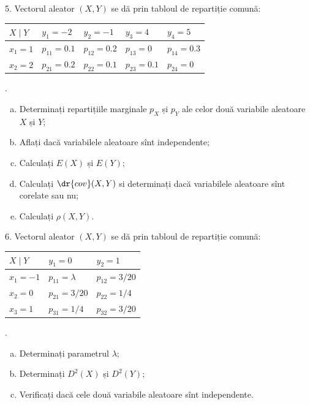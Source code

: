 5. Vectorul aleator $ (X, Y) $ se dă prin tabloul de repartiție comună:
\begin{center}
  \begin{tabular}{l|l|l|l|l}
    $ X \mid Y $ & $ y_1 = -2 $ & $ y_2 = -1 $ & $ y_3 = 4 $ & $ y_4 = 5 $ \\
    \hline
    $ x_1 = 1 $ & $ p_{11} = 0.1 $ & $ p_{12} = 0.2 $ & $ p_{13} = 0 $ & $ p_{14} = 0.3 $ \\
    \hline
    $ x_2 = 2 $ & $ p_{21} = 0.2 $ & $ p_{22} = 0.1 $ & $ p_{23} = 0.1 $ & $ p_{24} = 0 $
  \end{tabular}.
\end{center}
\begin{enumerate}[(a)]
\item Determinați repartițiile marginale $ p_X $ și $ p_Y $ ale celor două
  variabile aleatoare $ X $ și $ Y $;
\item Aflați dacă variabilele aleatoare sînt independente;
\item Calculați $ E(X) $ și $ E(Y) $;
\item Calculați $ \dr{cov}(X, Y) $ si determinați dacă variabilele aleatoare sînt
  corelate sau nu;
\item Calculați $ \rho(X, Y) $.
\end{enumerate}

\vspace{0.3cm}

6. Vectorul aleator $ (X, Y) $ se dă prin tabloul de repartiție comună:
\begin{center}
  \begin{tabular}{l|l|l}
    $ X \mid Y $ & $ y_1 = 0 $ & $ y_2 = 1 $ \\
    \hline
    $ x_1 = -1 $ & $ p_{11} = \lambda $ & $ p_{12} = 3/20 $ \\
    \hline
    $ x_2 = 0 $ & $ p_{21} = 3/20 $ & $ p_{22} = 1/4 $ \\
    \hline
    $ x_3 = 1 $ & $ p_{31} = 1/4 $ & $ p_{32} = 3/20 $
  \end{tabular}.
\end{center}
\begin{enumerate}[(a)]
\item Determinați parametrul $ \lambda $;
\item Determinați $ D^2(X) $ și $ D^2(Y) $;
\item Verificați dacă cele două variabile aleatoare sînt independente.
\end{enumerate}

\vspace{0.3cm}

